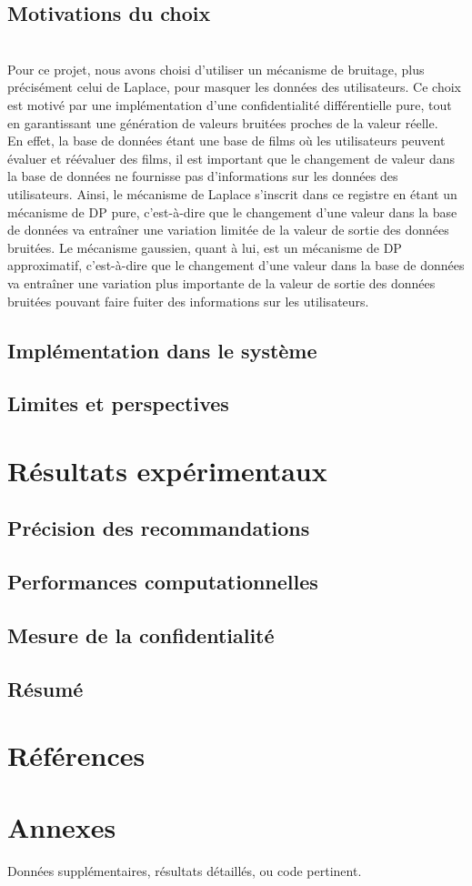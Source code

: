 \documentclass{article}
\begin{document}
\subsection{Motivations du choix}
$ $\\
Pour ce projet, nous avons choisi d'utiliser un mécanisme de bruitage, plus précisément celui de Laplace, pour masquer les données des utilisateurs.
Ce choix est motivé par une implémentation d'une confidentialité différentielle pure, tout en garantissant une génération de valeurs bruitées proches de la valeur réelle.\\
En effet, la base de données étant une base de films où les utilisateurs peuvent évaluer et réévaluer des films, il est important que le changement de valeur dans la base de données ne fournisse pas d'informations sur les données des utilisateurs.
Ainsi, le mécanisme de Laplace s'inscrit dans ce registre en étant un mécanisme de DP pure, c'est-à-dire que le changement d'une valeur dans la base de données va entraîner une variation limitée de la valeur de sortie des données bruitées.
Le mécanisme gaussien, quant à lui, est un mécanisme de DP approximatif, c'est-à-dire que le changement d'une valeur dans la base de données va entraîner une variation plus importante de la valeur de sortie des données bruitées pouvant faire fuiter des informations sur les utilisateurs.

\subsection{Implémentation dans le système}
\subsection{Limites et perspectives}


\section{Résultats expérimentaux}
\subsection{Précision des recommandations}
\subsection{Performances computationnelles}
\subsection{Mesure de la confidentialité}
\subsection{Résumé}

\section*{Références}

\appendix
\section*{Annexes}
Données supplémentaires, résultats détaillés, ou code pertinent.
\end{document}

